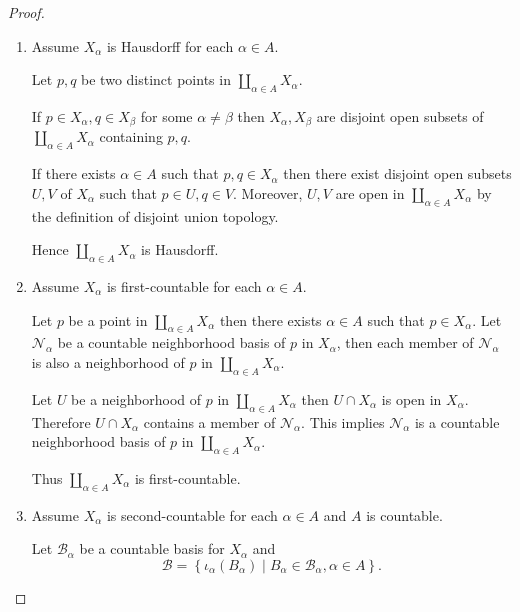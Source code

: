 \begin{proof}
\begin{enumerate}[itemsep=0pt,label={(\alph*)}]
              Hence \( X_{\alpha} \) has the subspace topology inherited from \( \coprod_{\alpha\in A} X_{\alpha} \), which means \( \iota_{\alpha} \) is a topological embedding.
        \item Assume \( X_{\alpha} \) is Hausdorff for each \( \alpha \in A \).

              Let \( p, q \) be two distinct points in \( \coprod_{\alpha\in A} X_{\alpha} \).

              If \( p \in X_{\alpha}, q \in X_{\beta} \) for some \( \alpha \ne \beta \) then \( X_{\alpha}, X_{\beta} \) are disjoint open subsets of \( \coprod_{\alpha\in A} X_{\alpha} \) containing \( p, q \).

              If there exists \( \alpha \in A \) such that \( p, q \in X_{\alpha} \) then there exist disjoint open subsets \( U, V \) of \( X_{\alpha} \) such that \( p \in U, q \in V \). Moreover, \( U, V \) are open in \( \coprod_{\alpha\in A} X_{\alpha} \) by the definition of disjoint union topology.

              Hence \( \coprod_{\alpha\in A} X_{\alpha} \) is Hausdorff.
        \item Assume \( X_{\alpha} \) is first-countable for each \( \alpha \in A \).

              Let \( p \) be a point in \( \coprod_{\alpha\in A} X_{\alpha} \) then there exists \( \alpha \in A \) such that \( p \in X_{\alpha} \). Let \( \mathcal{N}_{\alpha} \) be a countable neighborhood basis of \( p \) in \( X_{\alpha} \), then each member of \( \mathcal{N}_{\alpha} \) is also a neighborhood of \( p \) in \( \coprod_{\alpha\in A} X_{\alpha} \).

              Let \( U \) be a neighborhood of \( p \) in \( \coprod_{\alpha\in A} X_{\alpha} \) then \( U \cap X_{\alpha} \) is open in \( X_{\alpha} \). Therefore \( U \cap X_{\alpha} \) contains a member of \( \mathcal{N}_{\alpha} \). This implies \( \mathcal{N}_{\alpha} \) is a countable neighborhood basis of \( p \) in \( \coprod_{\alpha\in A} X_{\alpha} \).

              Thus \( \coprod_{\alpha\in A} X_{\alpha} \) is first-countable.
        \item Assume \( X_{\alpha} \) is second-countable for each \( \alpha \in A \) and \( A \) is countable.

              Let \( \mathcal{B}_{\alpha} \) be a countable basis for \( X_{\alpha} \) and
              \[
                  \mathcal{B} = \left\{ \iota_{\alpha}(B_{\alpha}) \mid B_{\alpha} \in \mathcal{B}_{\alpha}, \alpha \in A \right\}.
              \]


\end{enumerate}
\end{proof}
